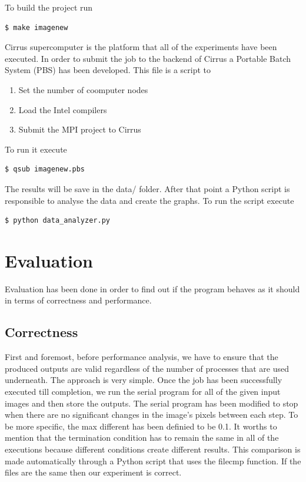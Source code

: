 \documentclass[12pt,a4paper]{article}
\begin{document}
	To build the project run
	\begin{lstlisting}[language=bash]
	$ make imagenew
	\end{lstlisting}
	
	Cirrus supercomputer is the platform that all of the experiments have been executed. In order to submit the job to the backend of Cirrus a Portable Batch System (PBS) has been developed. This file is a script to
	\begin{enumerate}
		\item Set the number of coomputer nodes
		\item Load the Intel compilers
		\item Submit the MPI project to Cirrus
	\end{enumerate}
	
	To run it execute
	\begin{lstlisting}[language=bash]
	$ qsub imagenew.pbs
	\end{lstlisting}

	The results will be save in the data/ folder. After that point a Python script is responsible to analyse the data and create the graphs. To run the script execute
	\begin{lstlisting}[language=bash]
	$ python data_analyzer.py
	\end{lstlisting}
	
\section{Evaluation}
    Evaluation has been done in order to find out if the program behaves as it should in terms of correctness and performance.

    \subsection{Correctness}
        First and foremost, before performance analysis, we have to ensure that the produced outputs are valid regardless of the number of processes that are used underneath. The approach is very simple. Once the job has been successfully executed till completion, we run the serial program for all of the given input images and then store the outputs. The serial program has been modified to stop when there are no significant changes in the image's pixels between each step. To be more specific, the max different has been definied to be 0.1. It worths to mention that the termination condition has to remain the same in all of the executions because different conditions create different results. This comparison is made automatically through a Python script that uses the filecmp function. If the files are the same then our experiment is correct.
\end{document}
